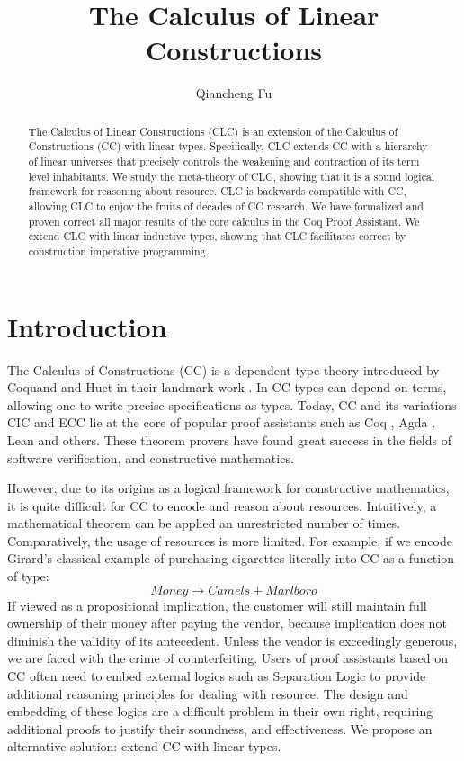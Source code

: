 \documentclass[sigplan,screen,review,authordraft]{acmart}
\title{The Calculus of Linear Constructions}
\author{Qiancheng Fu}
\affiliation{
  \institution{Boston University}
  \city{Boston}
  \state{MA}
  \country{USA}
}
\theoremstyle{definition}
\begin{document}
  \begin{abstract}
    The Calculus of Linear Constructions (CLC) is an extension of the Calculus of Constructions (CC) with linear types. Specifically, CLC extends CC with a hierarchy of linear universes that precisely controls the weakening and contraction of its term level inhabitants. We study the meta-theory of CLC, showing that it is a sound logical framework for reasoning about resource. CLC is backwards compatible with CC, allowing CLC to enjoy the fruits of decades of CC research. We have formalized and proven correct all major results of the core calculus in the Coq Proof Assistant. We extend CLC with linear inductive types, showing that CLC facilitates correct by construction imperative programming.
  \end{abstract}
  \maketitle 

  \section{Introduction}
  The Calculus of Constructions (CC) is a dependent type theory introduced by Coquand and Huet in their landmark work \cite{cc}. In CC types can depend on terms, allowing one to write precise specifications as types. Today, CC and its variations CIC \cite{cic} and ECC \cite{ecc} lie at the core of popular proof assistants such as Coq \cite{coq}, Agda \cite{agda}, Lean \cite{lean} and others. These theorem provers have found great success in the fields of software verification, and constructive mathematics. 
  
  However, due to its origins as a logical framework for constructive mathematics, it is quite difficult for CC to encode and reason about resources. Intuitively, a mathematical theorem can be applied an unrestricted number of times. Comparatively, the usage of resources is more limited. For example, if we encode Girard's classical example \cite{girard95} of purchasing cigarettes literally into CC as a function of type:
  \begin{equation*}
    Money \rightarrow Camels + Marlboro
  \end{equation*}
  If viewed as a propositional implication, the customer will still maintain full ownership of their money after paying the vendor, because implication does not diminish the validity of its antecedent. Unless the vendor is exceedingly generous, we are faced with the crime of counterfeiting. Users of proof assistants based on CC often need to embed external logics such as Separation Logic to provide additional reasoning principles for dealing with resource. The design and embedding of these logics are a difficult problem in their own right, requiring additional proofs to justify their soundness, and effectiveness. We propose an alternative solution: extend CC with linear types.
\end{document}
